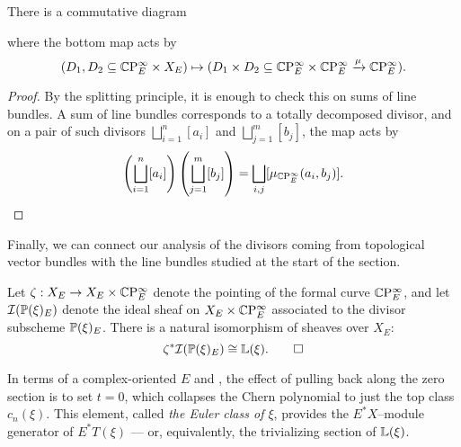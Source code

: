 \begin{corollary}
There is a commutative diagram
\begin{center}
\end{center}
where the bottom map acts by \[(D_1, D_2 \subseteq \CP^\infty_E \times X_E) \mapsto (D_1 \times D_2 \subseteq \CP^\infty_E \times \CP^\infty_E \xrightarrow{\mu} \CP^\infty_E).\]
\end{corollary}
\begin{proof}
By the splitting principle, it is enough to check this on sums of line bundles.  A sum of line bundles corresponds to a totally decomposed divisor, and on a pair of such divisors $\bigsqcup_{i=1}^n [a_i]$ and $\bigsqcup_{j=1}^m [b_j]$, the map acts by \[\left(\bigsqcup_{i=1}^n [a_i] \right) \left( \bigsqcup_{j=1}^m [b_j] \right) = \bigsqcup_{i, j} [\mu_{\CP^\infty_E}(a_i, b_j)]. \qedhere\]
\end{proof}

Finally, we can connect our analysis of the divisors coming from topological vector bundles with the line bundles studied at the start of the section.
\begin{lemma}
Let $\zeta: X_E \to X_E \times \CP^\infty_E$ denote the pointing of the formal curve $\CP^\infty_E$, and let $\sheaf I(\P(\xi)_E)$ denote the ideal sheaf on $X_E \times \CP^\infty_E$ associated to the divisor subscheme $\P(\xi)_E$.  There is a natural isomorphism of sheaves over $X_E$: \[\zeta^* \sheaf I(\P(\xi)_E) \cong \ThomSheaf{\xi}. \qed\]
\end{lemma}

\begin{remark}
In terms of a complex-oriented $E$ and , the effect of pulling back along the zero section is to set $t = 0$, which collapses the Chern polynomial to just the top class $c_n(\xi)$.  This element, called \textit{the Euler class of $\xi$}, provides the $E^* X$--module generator of $E^* T(\xi)$ --- or, equivalently, the trivializing section of $\ThomSheaf{\xi}$.
\end{remark}

